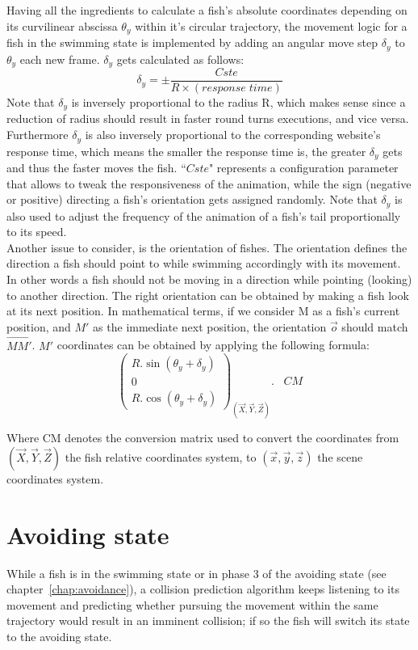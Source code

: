 Having all the ingredients to calculate a fish's absolute coordinates depending on its curvilinear abscissa $\theta_{y}$ within it's circular trajectory, the movement logic for a fish in the swimming state is implemented by adding an angular move step $\delta_{y}$ to $\theta_{y}$ each new frame. $\delta_y$ gets calculated as follows:
\[
\delta_y = \pm \frac{Cste}{R \times (response\; time)}
\]
Note that $\delta_{y}$ is inversely proportional to the radius R, which makes sense since a reduction of radius should result in faster round turns executions, and vice versa. Furthermore $\delta_y$ is also inversely proportional to the corresponding website's response time, which means the smaller the response time is, the greater $\delta_{y}$ gets and thus the faster moves the fish. ``$Cste$" represents a configuration parameter that allows to tweak the responsiveness of the animation, while the sign (negative or positive) directing a fish's orientation gets assigned randomly. Note that $\delta_{y}$ is also used to adjust the frequency of the animation of a fish's tail proportionally to its speed.\\


Another issue to consider, is the orientation of fishes. The orientation defines the direction a fish should point to while swimming accordingly with its movement. In other words a fish should not be moving in a direction while pointing (looking) to another direction. The right orientation can be obtained by making a fish look at its next position. In mathematical terms, if we consider M as a fish's current position, and $M'$ as the immediate next position, the orientation $\overrightarrow{o}$ should match $\overrightarrow{MM'}$. $M'$ coordinates can be obtained by applying the following formula:
\[
\begin{pmatrix}
R . \sin{(\theta_{y} + \delta_y)} \\
0 \\
R . \cos{(\theta_{y}  + \delta_y)}
\end{pmatrix}_{(\overrightarrow{X}, \overrightarrow{Y}, \overrightarrow{Z})} . \;\;\; CM
\]

Where CM denotes the conversion matrix used to convert the coordinates from $(\overrightarrow{X}, \overrightarrow{Y}, \overrightarrow{Z})$ the fish relative coordinates system, to $(\overrightarrow{x}, \overrightarrow{y}, \overrightarrow{z})$ the scene coordinates system.

\section{Avoiding state}
While a fish is in the swimming state or in phase 3 of the avoiding state (see chapter~\ref{chap:avoidance}), a collision prediction algorithm keeps listening to its movement and predicting whether pursuing the movement within the same trajectory would result in an imminent collision; if so the fish will switch its state to the avoiding state.


